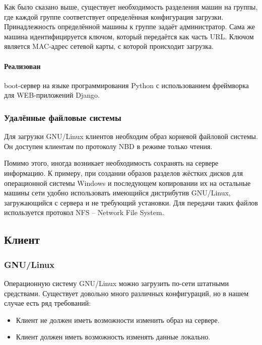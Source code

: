\documentclass[11pt]{article}
\begin{document}
Как было сказано выше, существует необходимость разделения машин на группы,
где каждой группе соответствует определённая конфигурация загрузки. Принадлежность
определённой машины к группе задаёт администратор. Сама же машина идентифицируется ключом,
который передаётся как часть URL. Ключом является MAC-адрес сетевой карты, с которой
происходит загрузка.

\paragraph{Реализован} boot-сервер на языке программирования Python
с использованием фреймворка для WEB-приложений Django.

\subsubsection{Удалённые файловые системы}
Для загрузки GNU/Linux клиентов необходим образ
корневой файловой системы. Он доступен клиентам
по протоколу NBD в режиме только чтения.

Помимо этого, иногда возникает необходимость
сохранять на сервере информацию. К примеру,
при создании образов разделов жёстких дисков
для операционной системы Windows и последующем
копировании их на остальные машины сети
удобно использовать имеющийся дистрибутив GNU/Linux,
загружающийся с сервера и не требующий установки.
Для передачи таких файлов используется протокол NFS --
Network File System.

\subsection{Клиент}

\subsubsection{GNU/Linux}
Операционную систему GNU/Linux можно загрузить по-сети
штатными средствами. Существует довольно много различных
конфигураций, но в нашем случае есть ряд требований:
\begin{itemize}
    \item Клиент не должен иметь возможности изменить образ на сервере.
    \item Клиент должен иметь возможность изменять данные локально.
\end{itemize}
\end{document}
